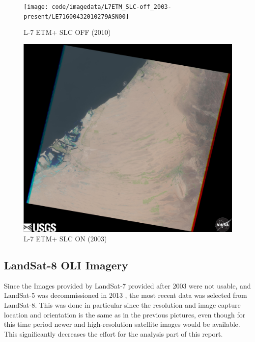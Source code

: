 \begin{figure}[h!]
\centering
\begin{minipage}{.5\textwidth}
	\centering
	\texttt{[image: code/imagedata/L7ETM\_SLC-off\_2003-present/LE71600432010279ASN00]}
	\caption{L-7 ETM+ SLC OFF (2010)}
	\label{fig:L7SLCOFF}
\end{minipage}%
\begin{minipage}{.5\textwidth}
	\centering
	\includegraphics[width=\textwidth-3em]{code/imagedata/L7ETM_SLC-on_1999-2003/LE71600432003148ASN00.jpg}
	\caption{L-7 ETM+ SLC ON (2003)}
	\label{fig:L7SLCON}
\end{minipage}
\end{figure}

\subsection{LandSat-8 OLI Imagery}
Since the Images provided by LandSat-7 provided after 2003 were not usable, and LandSat-5 was decommissioned in 2013 \citep{l5:usgs}, the most recent data was selected from LandSat-8. This was done in particular since the resolution and image capture location and orientation is the same as in the previous pictures, even though for this time period newer and high-resolution satellite images would be available. This significantly decreases the effort for the analysis part of this report.

